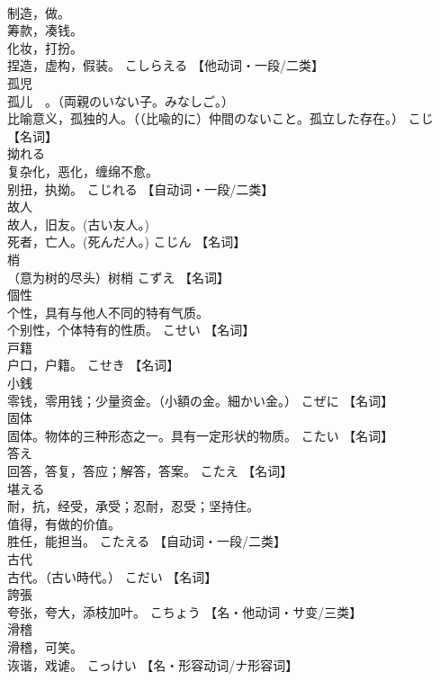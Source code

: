 \documentclass[8pt]{extreport}
\begin{document}
\begin{CJK}{UTF8}{min}
\\	制造，做。 
\\	筹款，凑钱。 
\\	化妆，打扮。 
\\	捏造，虚构，假装。	こしらえる		【他动词・一段/二类】
\\	孤児	
\\	孤儿　。（両親のいない子。みなしご。） 
\\	比喻意义，孤独的人。（（比喩的に）仲間のないこと。孤立した存在。）	こじ		【名词】
\\	拗れる	
\\	复杂化，恶化，缠绵不愈。 
\\	别扭，执拗。	こじれる		【自动词・一段/二类】
\\	故人	
\\	故人，旧友。(古い友人。) 
\\	死者，亡人。(死んだ人。)	こじん		【名词】
\\	梢	
\\	（意为树的尽头）树梢	こずえ		【名词】
\\	個性	
\\	个性，具有与他人不同的特有气质。 
\\	个别性，个体特有的性质。	こせい		【名词】
\\	戸籍	
\\	户口，户籍。	こせき		【名词】
\\	小銭	
\\	零钱，零用钱；少量资金。（小額の金。細かい金。）	こぜに		【名词】
\\	固体	
\\	固体。物体的三种形态之一。具有一定形状的物质。	こたい		【名词】
\\	答え	
\\	回答，答复，答应；解答，答案。	こたえ		【名词】
\\	堪える	
\\	耐，抗，经受，承受；忍耐，忍受；坚持住。 
\\	值得，有做的价值。 
\\	胜任，能担当。	こたえる		【自动词・一段/二类】
\\	古代	
\\	古代。（古い時代。）	こだい		【名词】
\\	誇張	
\\	夸张，夸大，添枝加叶。	こちょう		【名・他动词・サ变/三类】
\\	滑稽	
\\	滑稽，可笑。 
\\	诙谐，戏谑。	こっけい		【名・形容动词/ナ形容词】

\end{CJK}
\end{document}
